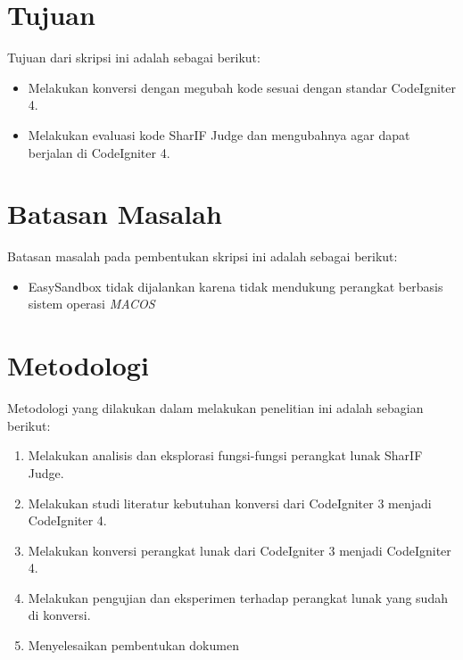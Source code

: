 \section{Tujuan}
\label{sec:tujuan}
Tujuan dari skripsi ini adalah sebagai berikut:
\begin{itemize}
	\item Melakukan konversi dengan megubah kode sesuai dengan standar CodeIgniter 4.
	\item Melakukan evaluasi kode SharIF Judge dan mengubahnya agar dapat berjalan di CodeIgniter 4.
\end{itemize}

\section{Batasan Masalah}
\label{sec:batasan}
Batasan masalah pada pembentukan skripsi ini adalah sebagai berikut:
\begin{itemize}
	\item EasySandbox tidak dijalankan karena tidak mendukung perangkat berbasis sistem operasi \textit{MACOS}
\end{itemize}

\section{Metodologi}
\label{sec:metlit}
Metodologi yang dilakukan dalam melakukan penelitian ini adalah sebagian berikut:
\begin{enumerate}
	\item Melakukan analisis dan eksplorasi fungsi-fungsi perangkat lunak SharIF Judge.
	\item Melakukan studi literatur kebutuhan konversi dari CodeIgniter 3 menjadi CodeIgniter 4.
	\item Melakukan konversi perangkat lunak dari CodeIgniter 3 menjadi CodeIgniter 4.
	\item Melakukan pengujian dan eksperimen terhadap perangkat lunak yang sudah di konversi.
	\item Menyelesaikan pembentukan dokumen
\end{enumerate}

